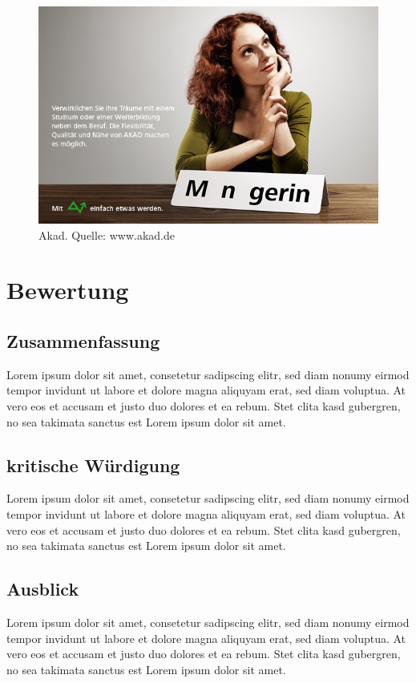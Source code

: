\documentclass[a4paper,12pt]{article}
\begin{document}
\begin{figure}[H]
\begin{center}
\includegraphics[scale=0.5]{akad_bild1.jpg}
\caption[Akad]{Akad. Quelle: www.akad.de}
\end{center}
\end{figure}


\section{Bewertung}

\subsection{Zusammenfassung}
Lorem ipsum dolor sit amet, consetetur sadipscing elitr, sed diam nonumy eirmod tempor invidunt ut labore et dolore magna aliquyam erat, sed diam voluptua. At vero eos et accusam et justo duo dolores et ea rebum. Stet clita kasd gubergren, no sea takimata sanctus est Lorem ipsum dolor sit amet.

\subsection{kritische Würdigung}
Lorem ipsum dolor sit amet, consetetur sadipscing elitr, sed diam nonumy eirmod tempor invidunt ut labore et dolore magna aliquyam erat, sed diam voluptua. At vero eos et accusam et justo duo dolores et ea rebum. Stet clita kasd gubergren, no sea takimata sanctus est Lorem ipsum dolor sit amet.

\subsection{Ausblick}
Lorem ipsum dolor sit amet, consetetur sadipscing elitr, sed diam nonumy eirmod tempor invidunt ut labore et dolore magna aliquyam erat, sed diam voluptua. At vero eos et accusam et justo duo dolores et ea rebum. Stet clita kasd gubergren, no sea takimata sanctus est Lorem ipsum dolor sit amet.
\end{document}
